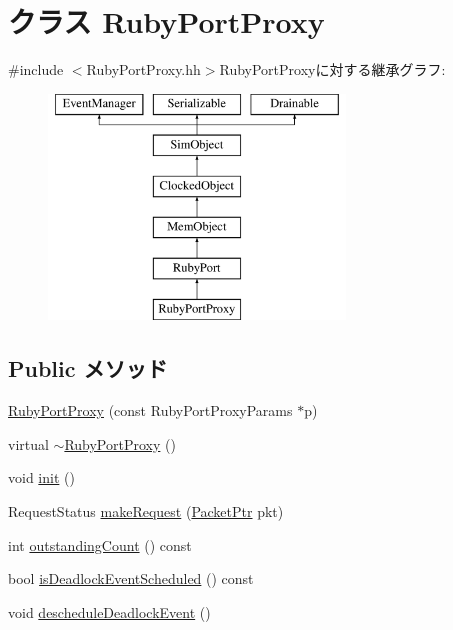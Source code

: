 \hypertarget{classRubyPortProxy}{
\section{クラス RubyPortProxy}
\label{classRubyPortProxy}
}


{\ttfamily \#include $<$RubyPortProxy.hh$>$}RubyPortProxyに対する継承グラフ:\begin{figure}[H]
\begin{center}
\leavevmode
\includegraphics[height=6cm]{classRubyPortProxy}
\end{center}
\end{figure}
\subsection*{Public メソッド}
\begin{DoxyCompactItemize}
\item 
\hyperlink{classRubyPortProxy_a565be517aac1eee5e1ab36bb4a2214ab}{RubyPortProxy} (const RubyPortProxyParams $\ast$p)
\item 
virtual \hyperlink{classRubyPortProxy_a7924d208d2536c85628f7cf205940c0a}{$\sim$RubyPortProxy} ()
\item 
void \hyperlink{classRubyPortProxy_a02fd73d861ef2e4aabb38c0c9ff82947}{init} ()
\item 
RequestStatus \hyperlink{classRubyPortProxy_a23de6e3fbb2362f4410d435e3600d0f7}{makeRequest} (\hyperlink{classPacket}{PacketPtr} pkt)
\item 
int \hyperlink{classRubyPortProxy_ae47593dc86baa86bf047ad1fbcdcceed}{outstandingCount} () const 
\item 
bool \hyperlink{classRubyPortProxy_a11ce018fbd3aa89624b06dbdafbd4ef9}{isDeadlockEventScheduled} () const 
\item 
void \hyperlink{classRubyPortProxy_a7c9a8861621a62055761f47310814762}{descheduleDeadlockEvent} ()
\end{DoxyCompactItemize}


